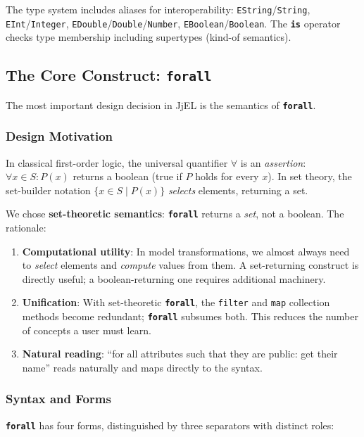 \documentclass[11pt,a4paper]{article}
\newcommand{\jjel}{\textsf{JjEL}}
\newcommand{\kw}[1]{\texttt{\textbf{#1}}}
\begin{document}
The type system includes aliases for interoperability: \texttt{EString}/\texttt{String}, \texttt{EInt}/\texttt{Integer}, \texttt{EDouble}/\texttt{Double}/\texttt{Number}, \texttt{EBoolean}/\texttt{Boolean}. The \kw{is} operator checks type membership including supertypes (kind-of semantics).


\subsection{The Core Construct: \texttt{forall}}\label{sec:forall}

The most important design decision in \jjel{} is the semantics of \kw{forall}.

\subsubsection{Design Motivation}

In classical first-order logic, the universal quantifier $\forall$ is an \emph{assertion}: $\forall x \in S : P(x)$ returns a boolean (true if $P$ holds for every $x$). In set theory, the set-builder notation $\{x \in S \mid P(x)\}$ \emph{selects} elements, returning a set.

We chose \textbf{set-theoretic semantics}: \kw{forall} returns a \emph{set}, not a boolean. The rationale:

\begin{enumerate}
    \item \textbf{Computational utility}: In model transformations, we almost always need to \emph{select} elements and \emph{compute} values from them. A set-returning construct is directly useful; a boolean-returning one requires additional machinery.
    \item \textbf{Unification}: With set-theoretic \kw{forall}, the \texttt{filter} and \texttt{map} collection methods become redundant; \kw{forall} subsumes both. This reduces the number of concepts a user must learn.
    \item \textbf{Natural reading}: ``for all attributes such that they are public: get their name'' reads naturally and maps directly to the syntax.
\end{enumerate}

\subsubsection{Syntax and Forms}

\kw{forall} has four forms, distinguished by three separators with distinct roles:
\end{document}
